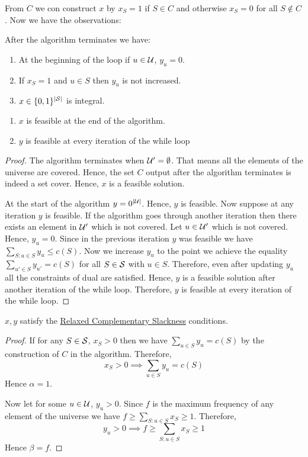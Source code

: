 From $C$ we con construct $x$ by $x_S=1$ if $S\in C$ and otherwise $x_S=0$ for all $S\notin C$. Now we have the observations:
\begin{observation*}After the algorithm terminates we have:
    \begin{enumerate}
        \item At the beginning of the loop if $u\in\mathcal{U}$, $y_u=0$.
        \item If $x_S=1$ and $u\in S$ then $y_u$ is not increased.
        \item $x\in\{0,1\}^{|\mathcal{S}|}$ is integral.
    \end{enumerate}
\end{observation*}
\begin{lemma}{}{}
    \begin{enumerate}
        \item $x$ is feasible at the end of the algorithm.
        \item $y$ is feasible at every iteration of the while loop
    \end{enumerate}
\end{lemma}
\begin{proof}
    The algorithm terminates when $\mathcal{U}'=\emptyset$. That means all the elements of the universe are covered. Hence, the set $C$ output after the algorithm terminates is indeed a set cover. Hence, $x$ is a feasible solution.

    At the start of the algorithm $y=0^{|\mathcal{U}|}$. Hence, $y$ is feasible. Now suppose at any iteration $y$ is feasible. If the algorithm goes through another iteration then there exists an element in $\mathcal{U}'$ which is not covered. Let $u\in\mathcal{U}'$ which is not covered. Hence, $y_u=0$. Since in the previous iteration $y$ was feasible we have $\sum\limits_{S:u\in S}y_u\leq c(S)$. Now we increase $y_u$ to the point we achieve the equality $\sum\limits_{u'\in S}y_{u'}=c(S)$ for all $S\in\mathcal{S}$ with $u\in S$. Therefore, even after updating $y_u$ all the constraints of dual are satisfied. Hence, $y$ is a feasible solution after another iteration of the while loop. Therefore, $y$ is feasible at every iteration of the while loop.
\end{proof}

\begin{lemma}{}{}
    $x,y$ satisfy the \hyperref[th:relaxed-cs]{Relaxed Complementary Slackness} conditions.
\end{lemma}
\begin{proof}
    If for any $S\in\mathcal{S}$, $x_S>0$ then we have $\sum\limits_{u\in S}y_u=c(S)$ by the construction of $C$ in the algorithm. Therefore, $$x_S>0\implies \sum\limits_{u\in S}y_u=c(S)$$Hence $\alpha=1$.

    Now let for some $u\in\mathcal{U}$, $y_u>0$. Since $f$ is the maximum frequency of any element of the universe we have $f\geq \sum\limits_{S:u\in S}x_S\geq 1$. Therefore, $$y_u>0\implies f\geq \sum\limits_{S:u\in S}x_S\geq 1$$Hence $\beta=f$. 
\end{proof}

